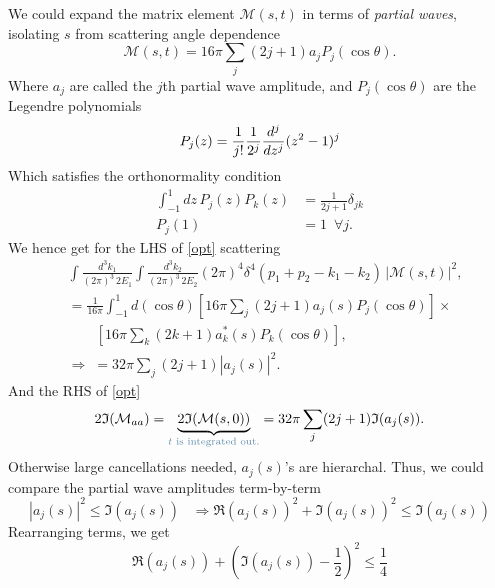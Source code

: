 We could expand the matrix element $\mathcal M (s,t)$ in terms of \emph{partial waves}, isolating $s$ from scattering angle dependence
\begin{equation}
	\mathcal M (s,t) = 16 \pi \sum_j (2j+1)a_j P_j(\cos \theta).
\end{equation}
Where $a_j $ are called the $j$th partial wave amplitude, and  $P_j(\cos \theta)$ are the Legendre polynomials 
\begin{equation}
	P_j(z) = \frac{1}{j!}\frac{1}{2^j} {d^j\over dz^j} (z^2-1)^j
\end{equation}
Which satisfies the orthonormality condition
\begin{subequations}
	\begin{align}
		\int_{-1}^{1} dz \,P_j(z) P_k(z) &= \frac{1}{2j+1} \delta_{jk} \\
		P_j(1) &= 1 \,\,\, \forall j.
	\end{align}
\end{subequations}
We hence get for the LHS of \eqref{opt} scattering 
\begin{align}
	&\int  \frac{d^3k_1}{(2 \pi)^3\,2E_1} \int  \frac{d^3k_2}{(2 \pi)^3\,2E_2} (2 \pi)^4 \delta^4(p_1+p_2-k_1-k_2)\,| \mathcal M (s,t)|^2 ,\nonumber \\
	&= \frac{1}{16 \pi} \int_{-1}^{1} d(\cos \theta) \left[ 16 \pi \sum_j (2j+1) a_j(s) P_j(\cos \theta)\right] \times \nonumber\\ & \qquad \left[ 16 \pi \sum_k (2k+1) a_k^*(s) P_k(\cos \theta)\right], \nonumber \\
	&\Rightarrow \; = 32 \pi \sum_j (2j+1)| a_j(s)|^2.
\end{align}
And the RHS of \eqref{opt}
\begin{equation}
	2 \mathfrak{I}( \mathcal M_{aa}) = \underbrace{2 \mathfrak{I}( \mathcal M(s,0))}_{\color{Mahogany}\text{$t$ is integrated out.}} = 32 \pi  \sum_j (2j+1) \mathfrak{I} (a_j(s)). 
\end{equation}
Otherwise large cancellations needed, $a_j(s)$'s are hierarchal. Thus, we could compare the partial wave amplitudes term-by-term 
\begin{equation}
	| a_j(s)|^2 \leq \mathfrak{I} (a_j(s)) \;\;\; \Rightarrow \mathfrak{R} (a_j(s))^2+ \mathfrak{I} (a_j(s))^2 \leq \mathfrak{I} (a_j(s))
\end{equation}
Rearranging terms, we get
\begin{equation}
	\mathfrak{R} (a_j(s)) +\left( \mathfrak{I} (a_j(s))- \frac{1}{2} \right)^2 \leq \frac{1}{4}
\end{equation}
